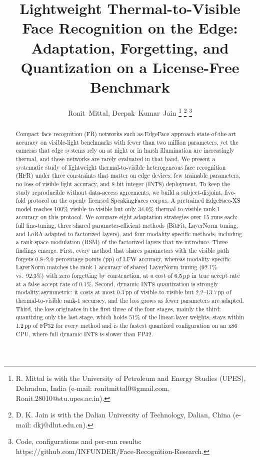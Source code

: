 \documentclass[journal]{IEEEtran}
\begin{document}
\title{Lightweight Thermal-to-Visible Face Recognition on the Edge: Adaptation, Forgetting, and Quantization on a License-Free Benchmark}

\author{Ronit~Mittal, Deepak~Kumar~Jain%
\thanks{R. Mittal is with the University of Petroleum and Energy Studies (UPES), Dehradun, India (e-mail: ronitmittal0@gmail.com, Ronit.28010@stu.upes.ac.in).}%
\thanks{D. K. Jain is with the Dalian University of Technology, Dalian, China (e-mail: dkj@dlut.edu.cn).}%
\thanks{Code, configurations and per-run results: https://github.com/INFUNDER/Face-Recognition-Research.}}


\maketitle

\begin{abstract}
Compact face recognition (FR) networks such as EdgeFace approach state-of-the-art accuracy on visible-light benchmarks with fewer than two million parameters, yet the cameras that edge systems rely on at night or in harsh illumination are increasingly thermal, and these networks are rarely evaluated in that band. We present a systematic study of lightweight thermal-to-visible heterogeneous face recognition (HFR) under three constraints that matter on edge devices: few trainable parameters, no loss of visible-light accuracy, and 8-bit integer (INT8) deployment. To keep the study reproducible without data-access agreements, we build a subject-disjoint, five-fold protocol on the openly licensed SpeakingFaces corpus. A pretrained EdgeFace-XS model reaches 100\% visible-to-visible but only 34.0\% thermal-to-visible rank-1 accuracy on this protocol. We compare eight adaptation strategies over 15 runs each: full fine-tuning, three shared parameter-efficient methods (BitFit, LayerNorm tuning, and LoRA adapted to factorized layers), and four modality-specific methods, including a rank-space modulation (RSM) of the factorized layers that we introduce. Three findings emerge. First, every method that shares parameters with the visible path forgets 0.8--2.0 percentage points (pp) of LFW accuracy, whereas modality-specific LayerNorm matches the rank-1 accuracy of shared LayerNorm tuning (92.1\% vs.\ 92.3\%) with zero forgetting by construction, at a cost of 6.5\,pp in true accept rate at a false accept rate of 0.1\%. Second, dynamic INT8 quantization is strongly modality-asymmetric: it costs at most 0.3\,pp of visible-to-visible but 2.2--13.7\,pp of thermal-to-visible rank-1 accuracy, and the loss grows as fewer parameters are adapted. Third, the loss originates in the first three of the four stages, mainly the third: quantizing only the last stage, which holds 51\% of the linear-layer weights, stays within 1.2\,pp of FP32 for every method and is the fastest quantized configuration on an x86 CPU, where full dynamic INT8 is slower than FP32.
\end{abstract}
\end{document}
